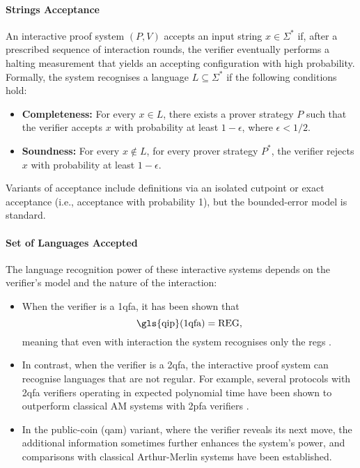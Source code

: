 \paragraph{Strings Acceptance}
An interactive proof system $(P,V)$ accepts an input string $x\in\Sigma^*$ if, after a prescribed sequence of interaction rounds, the verifier eventually performs a halting measurement that yields an accepting configuration with high probability. Formally, the system recognises a language $L\subseteq\Sigma^*$ if the following conditions hold:
\begin{itemize}
  \item \textbf{Completeness:} For every $x\in L$, there exists a prover strategy $P$ such that the verifier accepts $x$ with probability at least $1-\epsilon$, where $\epsilon<1/2$.
  \item \textbf{Soundness:} For every $x\notin L$, for every prover strategy $P^*$, the verifier rejects $x$ with probability at least $1-\epsilon$.
\end{itemize}
Variants of acceptance include definitions via an isolated cutpoint or exact acceptance (i.e., acceptance with probability 1), but the bounded-error model is standard.

\paragraph{Set of Languages Accepted}
The language recognition power of these interactive systems depends on the verifier's model and the nature of the interaction:
\begin{itemize}
  \item When the verifier is a \gls{1qfa}, it has been shown that
  \[
  \text{\gls{qip}(1qfa)} = \text{REG},
  \]
  meaning that even with interaction the system recognises only the \glspl{reg} \cite{nishimura2009application}.
  \item In contrast, when the verifier is a \gls{2qfa}, the interactive proof system can recognise languages that are not regular. For example, several protocols with 2qfa verifiers operating in expected polynomial time have been shown to outperform classical AM systems with 2pfa verifiers \cite{zheng2015power, nishimura2015interactive}.
  \item In the public-coin (\gls{qam}) variant, where the verifier reveals its next move, the additional information sometimes further enhances the system's power, and comparisons with classical Arthur-Merlin systems have been established.
\end{itemize}

